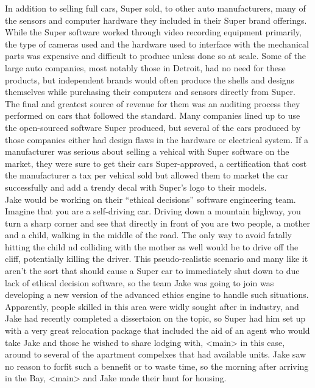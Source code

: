 \documentclass[12pt,openany]{memoir}
\begin{document}
In addition to selling full cars, Super sold, to other auto manufacturers, many of the sensors and computer hardware they included in their Super brand offerings.
While the Super software worked through video recording equipment primarily, the type of cameras used and the hardware used to interface with the mechanical parts was expensive and difficult to produce unless done so at scale.
Some of the large auto companies, most notably those in Detroit, had no need for these products, but independent brands would often produce the shells and designs themselves while purchasing their computers and sensors directly from Super.
\\

The final and greatest source of revenue for them was an auditing process they performed on cars that followed the standard.
Many companies lined up to use the open-sourced software Super produced, but several of the cars produced by those companies either had design flaws in the hardware or electrical system.
If a manufacturer was serious about selling a vehical with Super software on the market, they were sure to get their cars Super-approved, a certification that cost the manufacturer a tax per vehical sold but allowed them to market the car successfully and add a trendy decal with Super's logo to their models.
\\

Jake would be working on their ``ethical decisions'' software engineering team.
Imagine that you are a self-driving car.
Driving down a mountain highway, you turn a sharp corner and see that directly in front of you are two people, a mother and a child, walking in the middle of the road.
The only way to avoid fatally hitting the child nd colliding with the mother as well would be to drive off the cliff, potentially killing the driver.
This pseudo-realistic scenario and many like it aren't the sort that should cause a Super car to immediately shut down to due lack of ethical decision software, so the team Jake was going to join was developing a new version of the advanced ethics engine to handle such situations.
\\

Apparently, people skilled in this area were widly sought after in industry, and Jake had recently completed a dissertaion on the topic, so Super had him set up with a very great relocation package that included the aid of an agent who would take Jake and those he wished to share lodging with, <main> in this case, around to several of the apartment compelxes that had available units.
Jake saw no reason to forfit such a bennefit or to waste time, so the morning after arriving in the Bay, <main> and Jake made their hunt for housing.
\\
\end{document}
